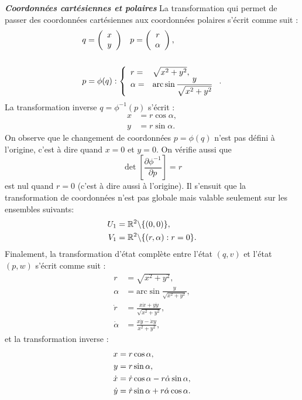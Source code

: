 \begin{exemple}{\bf \em Coordonnées cartésiennes et polaires}
La transformation qui permet de passer des coordonnées
cartésiennes aux coordonnées polaires s'écrit comme suit :
\begin{equation*} \begin{split}
&q = \bma{c} x \\y \ema \;\;\; p = \bma{c} r\\ \alpha \ema,\\
& \vm \\
&p = \phi(q) : \left\{ \begin{array}{ll}
r =&\sqrt{x^2 + y^2},\\ 
\alpha  =&\mbox{arc} \sin \dfrac{y}{\sqrt{x^2 + y^2}} 
\end{array}
\right..
\end{split} \end{equation*} 
La transformation inverse $q = \phi^{-1} (p) $ s'écrit :
\begin{equation*} \begin{split}
x &= r \cos \alpha,\\
y &= r \sin \alpha.
\end{split} \end{equation*}
On observe que le changement de coordonnées $p = \phi(q)$ n'est pas
défini à l'origine, c'est à dire quand $x=0$ et $y=0$.  On
vérifie aussi que 
$$ \det[\frac{\partial \phi^{-1}}{\partial p} ] = r
$$
est nul quand $r=0$ (c'est à dire aussi à l'origine).  Il
s'ensuit que la transformation de coordonnées n'est pas globale
mais valable seulement sur les ensembles suivants:
\begin{equation*} \begin{split}
U_1 &=\mathbb{R}^2 \backslash \{(0,0)\},\\
V_1 &= \mathbb{R}^2 \backslash \{(r, \alpha) : r = 0\}.
\end{split} \end{equation*}
Finalement, la transformation d'état complète entre l'état
$(q,v)$ et l'état $(p,w)$ s'écrit comme suit :
\begin{equation*} \begin{split}
r&= \sqrt{x^2 +y^2},\\
\alpha &= \mbox{arc} \sin \frac{y}{\sqrt{x^2 +y^2}},\\
\dot r &= \frac{x \dot x + y \dot y}{\sqrt{x^2 +y^2}},\\
\dot \alpha &= \frac{x \dot y - \dot x y}{x^2 + y^2},
\end{split} \end{equation*}
et la transformation inverse :
\begin{equation*} \begin{split}
x&= r \cos \alpha,\\
y &= r \sin \alpha,\\
\dot x &= \dot r \cos \alpha - r \dot \alpha \sin \alpha,\\
\dot y &= \dot r \sin \alpha + r \dot \alpha \cos \alpha. \xqedhere{4.6cm}{\qed}
\end{split} \end{equation*}
\end{exemple}


